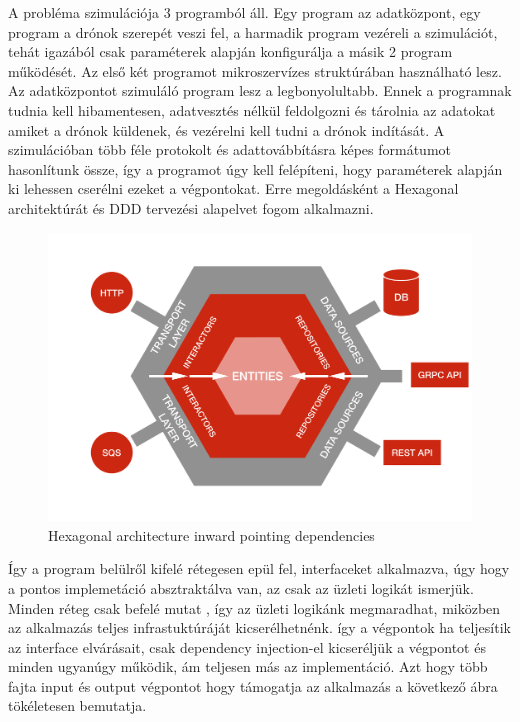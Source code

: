 A probléma szimulációja 3 programból áll. Egy program az adatközpont, egy program a drónok szerepét veszi fel, a harmadik program vezéreli a szimulációt,
tehát igazából csak paraméterek alapján konfigurálja a másik 2 program működését. Az első két programot mikroszervízes struktúrában használható lesz.\\
Az adatközpontot szimuláló program lesz a legbonyolultabb. Ennek a programnak tudnia kell hibamentesen, adatvesztés nélkül
feldolgozni és tárolnia az adatokat amiket a drónok küldenek, és vezérelni kell tudni a drónok indítását.
A szimulációban több féle protokolt és adattovábbításra képes formátumot hasonlítunk össze, így a programot úgy kell felépíteni,
hogy paraméterek alapján ki lehessen cserélni ezeket a végpontokat.
Erre megoldásként a Hexagonal architektúrát  és DDD tervezési alapelvet fogom alkalmazni.
\begin{figure}[h]
    \centering
    \includegraphics[scale=0.07]{images/hexa-inward.png}
    \caption{Hexagonal architecture inward pointing dependencies}
    \label{fig:hexagonal-inward}
\end{figure}
Így a program belülről kifelé rétegesen epül fel, interfaceket alkalmazva, úgy hogy a pontos implemetáció absztraktálva van, az csak az üzleti logikát ismerjük.
Minden réteg csak befelé mutat , így az üzleti logikánk megmaradhat, miközben az alkalmazás teljes infrastuktúráját kicserélhetnénk.
így a végpontok ha teljesítik az interface elvárásait, csak dependency injection-el kicseréljük a végpontot és minden ugyanúgy működik, ám teljesen más az implementáció.
Azt hogy több fajta input és output végpontot hogy  támogatja az alkalmazás a következő ábra  tökéletesen bemutatja.
